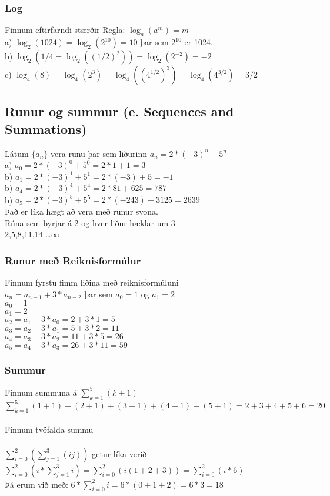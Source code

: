 \subsubsection*{Log}
Finnum eftirfarndi stærðir \quad Regla: $\log_a(a^m)=m$\\
a) $\log_2(1024) = \log_2(2^{10}) = 10$ þar sem $2^{10}$ er 1024.\\
b) $\log_2(1/4 = \log_2((1/2)^2)) = \log_2(2^{-2}) = -2$\\
c) $\log_4(8) = \log_4(2^3) = \log_4((4^{1/2})^3) = \log_4(4^{3/2}) = 3/2$
\newpage

\subsection{Runur og summur (e. Sequences and Summations)}
Látum $\{a_n\}$ vera runu þar sem liðurinn $a_n = 2* (-3)^n + 5^n$\\
a) $a_0 = 2* (-3)^0 + 5^0 = 2*1+1=3$\\
b) $a_1 = 2* (-3)^1 + 5^1 = 2 * (-3)+5=-1$\\
b) $a_4 = 2* (-3)^4 + 5^4 = 2 * 81 + 625 = 787$\\
b) $a_5 = 2* (-3)^5 + 5^5 = 2 * (-243) + 3125 = 2639$\\
Það er líka hægt að vera með runur svona.\\
Rúna sem byrjar á 2 og hver liður hæklar um 3\\
\hspace*{1em}2,5,8,11,14 \ldots $\infty$\\
\subsubsection{Runur með Reiknisformúlur}
Finnum fyrstu fimm liðina með reiknisformúluni\\
$a_n = a_{n-1}+3*a_{n-2}$ þar sem $a_0 = 1$ og $a_1=2$\\
$a_0 = 1$\\
$a_1 = 2$\\
$a_2 = a_1 +3 * a_0 = 2 + 3 * 1 = 5$\\
$a_3 = a_2 +3 * a_1 = 5 + 3 * 2 = 11$\\
$a_4 = a_3 +3 * a_2 = 11 + 3 * 5 = 26$\\
$a_5 = a_4 +3 * a_3 = 26 + 3 * 11 = 59$\\
\subsubsection{Summur}
Finnum summuna á $\displaystyle \sum_{k=1}^{5} (k+1)$\\
$\displaystyle \sum_{k=1}^{5} (1+1) + (2+1) + (3+1) + (4+1) +(5+1) = 2 + 3 + 4 + 5 + 6 = 20$\\ \\
Finnum tvöfalda summu\\ \\
$\displaystyle \sum_{i=0}^{2} \left(\sum_{j=1}^{3}(ij)\right)$ getur líka verið $\displaystyle \sum_{i=0}^{2} \left(i * \sum_{j=1}^{3}i\right) = \sum_{i=0}^{2}(i(1+2+3))= \sum_{i=0}^{2} (i*6)$\\
Þá erum við með: $\displaystyle 6* \sum_{i=0}^{2}i = 6 * (0 + 1 + 2) = 6 * 3 = 18$
\newpage

